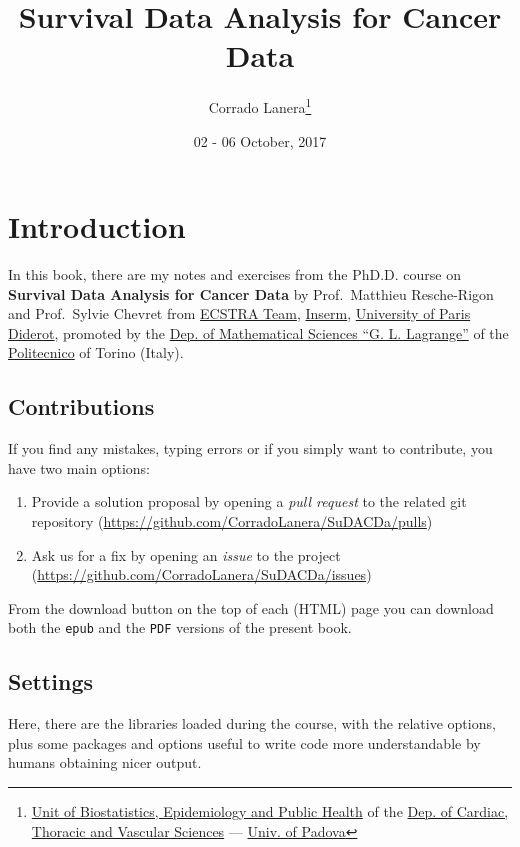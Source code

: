 \documentclass[]{book}
\title{Survival Data Analysis for Cancer Data}
\author{Corrado Lanera\footnote{\href{http://www.dctv.unipd.it/dipartimento/strutture/biostatistica}{Unit
  of Biostatistics, Epidemiology and Public Health} of the
  \href{http://www.dctv.unipd.it/}{Dep. of Cardiac, Thoracic and
  Vascular Sciences} --- \href{http://www.unipd.it/}{Univ. of Padova}}}
\date{02 - 06 October, 2017}
\providecommand{\tightlist}{%
  \setlength{\itemsep}{0pt}\setlength{\parskip}{0pt}}
\theoremstyle{definition}
\theoremstyle{definition}
\theoremstyle{definition}
\theoremstyle{remark}
\begin{document}
\maketitle

{
\setcounter{tocdepth}{1}
\tableofcontents
}
\chapter*{Introduction}\label{introduction}

In this book, there are my notes and exercises from the PhD.D. course on
\textbf{Survival Data Analysis for Cancer Data} by Prof.~Matthieu
Resche-Rigon and Prof.~Sylvie Chevret from
\href{http://www.cress-umr1153.fr/}{ECSTRA Team},
\href{https://www.inserm.fr/}{Inserm},
\href{https://www.univ-paris-diderot.fr/}{University of Paris Diderot},
promoted by the \href{http://www.disma.polito.it/}{Dep. of Mathematical
Sciences ``G. L. Lagrange''} of the
\href{http://www.polito.it/}{Politecnico} of Torino (Italy).

\section*{Contributions}\label{contributions}

If you find any mistakes, typing errors or if you simply want to
contribute, you have two main options:

\begin{enumerate}
\def\labelenumi{\arabic{enumi}.}
\tightlist
\item
  Provide a solution proposal by opening a \emph{pull request} to the
  related git repository
  (\url{https://github.com/CorradoLanera/SuDACDa/pulls})
\item
  Ask us for a fix by opening an \emph{issue} to the project
  (\url{https://github.com/CorradoLanera/SuDACDa/issues})
\end{enumerate}

From the download button on the top of each (HTML) page you can download
both the \texttt{epub} and the \texttt{PDF} versions of the present
book.

\section*{Settings}\label{settings}

Here, there are the libraries loaded during the course, with the
relative options, plus some packages and options useful to write code
more understandable by humans obtaining nicer output.
\end{document}
